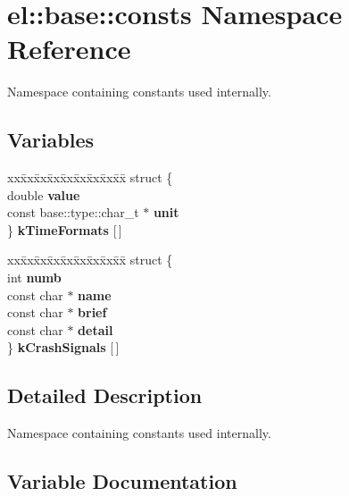 \hypertarget{namespaceel_1_1base_1_1consts}{}\section{el\+:\+:base\+:\+:consts Namespace Reference}
\label{namespaceel_1_1base_1_1consts}


Namespace containing constants used internally.  


\subsection*{Variables}
\begin{DoxyCompactItemize}
\item 
\begin{tabbing}
xx\=xx\=xx\=xx\=xx\=xx\=xx\=xx\=xx\=\kill
struct \{\\
\>double {\bfseries value}\\
\>const base::type::char\_t $\ast$ {\bfseries unit}\\
\} {\bfseries kTimeFormats} \mbox{[}$\,$\mbox{]}\\

\end{tabbing}\item 
\begin{tabbing}
xx\=xx\=xx\=xx\=xx\=xx\=xx\=xx\=xx\=\kill
struct \{\\
\>int {\bfseries numb}\\
\>const char $\ast$ {\bfseries name}\\
\>const char $\ast$ {\bfseries brief}\\
\>const char $\ast$ {\bfseries detail}\\
\} {\bfseries kCrashSignals} \mbox{[}$\,$\mbox{]}\\

\end{tabbing}\end{DoxyCompactItemize}


\subsection{Detailed Description}
Namespace containing constants used internally. 

\subsection{Variable Documentation}
